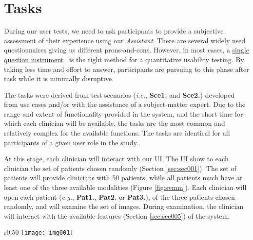 
\section{Tasks}
\label{sec:sec007}

During our user tests, we need to ask participants to provide a subjective assessment of their experience using our \textit{Assistant}. There are several widely used questionnaires giving us different prons-and-cons. However, in most cases, a \hyperlink{https://www.nngroup.com/articles/keep-online-surveys-short/}{single question instrument}~\cite{sauro201210} is the right method for a quantitative usability testing. By taking less time and effort to answer, participants are pursuing to this phase after task while it is minimally disruptive.

\clearpage

The tasks were derived from test scenarios ({\it i.e.}, {\bf Sce1.} and {\bf Sce2.}) developed from use cases and/or with the assistance of a subject-matter expert.  Due to the range and extent of functionality provided in the system, and the short time for which each clinician will be available, the tasks are the most common and relatively complex for the available functions. The tasks are identical for all participants of a given user role in the study.

At this stage, each clinician will interact with our UI. The UI show to each clinician the set of patients chosen randomly (Section \ref{sec:sec001}). The set of patients will provide clinicians with 50 patients, while all patients much have at least one of the three available modalities (Figure \ref{fig:svmm}). Each clinician will open each patient ({\it e.g.}, {\bf Pat1.}, {\bf Pat2.} or {\bf Pat3.}), of the three patients chosen randomly, and will examine the set of images. During examination, the clinician will interact with the available features (Section \ref{sec:sec005}) of the system.


\hfill

\begin{wrapfigure}{r}{0.50\textwidth}
\centering
\texttt{[image: img001]}
\caption{Diagram representing the use of the \textit{Assistant} by clinicians.}
\label{fig:svmm}
\end{wrapfigure}

